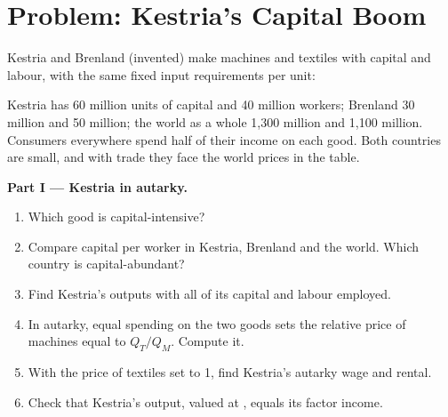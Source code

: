 \section{Problem: Kestria's Capital Boom}\label{sec:b3:factor-endowments:problem}

\begin{problem}\label{pb:b3:factor-endowments:boom}
Kestria and Brenland (invented) make machines and textiles with capital and
labour, with the same fixed input requirements per unit:
\begin{center}\small
{}
\end{center}
Kestria has 60 million units of capital and 40 million workers; Brenland 30
million and 50 million; the world as a whole 1{,}300 million and 1{,}100 million.
Consumers everywhere spend half of their income on each good. Both countries are
small, and with trade they face the world prices in the table.

\medskip\noindent\textbf{Part I --- Kestria in autarky.}
\begin{enumerate}
\item Which good is capital-intensive?
\item Compare capital per worker in Kestria, Brenland and the world. Which country
is capital-abundant?
\item Find Kestria's outputs with all of its capital and labour employed.
\item In autarky, equal spending on the two goods sets the relative price of
machines equal to $Q_T/Q_M$. Compute it.
\item With the price of textiles set to 1, find Kestria's autarky wage and
rental.
\item Check that Kestria's output, valued at , equals its factor
income.
\end{enumerate}


\end{problem}
